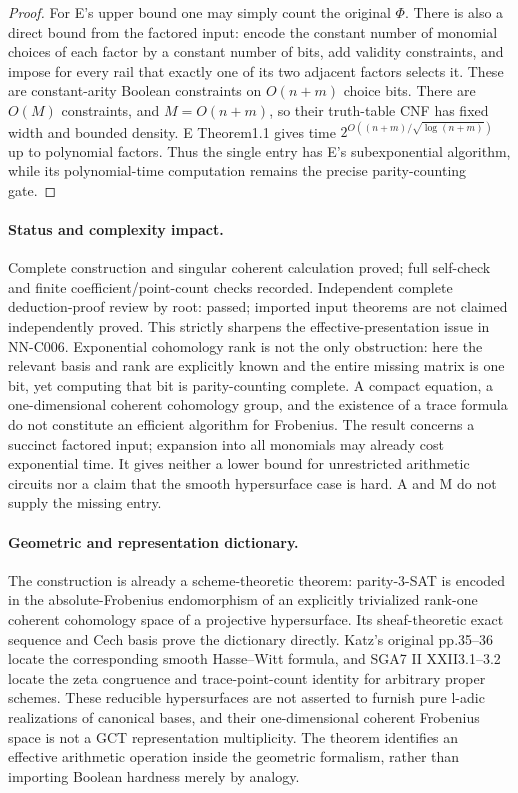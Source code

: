 \begin{proof}
For E's upper bound one may simply count the original $\Phi$. There is also a direct bound from the factored input: encode the constant number of monomial choices of each factor by a constant number of bits, add validity constraints, and impose for every rail that exactly one of its two adjacent factors selects it. These are constant-arity Boolean constraints on $O(n+m)$ choice bits. There are $O(M)$ constraints, and $M=O(n+m)$, so their truth-table CNF has fixed width and bounded density. E Theorem1.1 gives time $2^{O((n+m)/\sqrt{\log(n+m)})}$ up to polynomial factors. Thus the single entry has E's subexponential algorithm, while its polynomial-time computation remains the precise parity-counting gate.
\end{proof}
\paragraph{Status and complexity impact.}
Complete construction and singular coherent calculation proved; full self-check and finite coefficient/point-count checks recorded. Independent complete deduction-proof review by root: passed; imported input theorems are not claimed independently proved. This strictly sharpens the effective-presentation issue in NN-C006. Exponential cohomology rank is not the only obstruction: here the relevant basis and rank are explicitly known and the entire missing matrix is one bit, yet computing that bit is parity-counting complete. A compact equation, a one-dimensional coherent cohomology group, and the existence of a trace formula do not constitute an efficient algorithm for Frobenius. The result concerns a succinct factored input; expansion into all monomials may already cost exponential time. It gives neither a lower bound for unrestricted arithmetic circuits nor a claim that the smooth hypersurface case is hard. A and M do not supply the missing entry.

\paragraph{Geometric and representation dictionary.}
The construction is already a scheme-theoretic theorem: parity-3-SAT is encoded in the absolute-Frobenius endomorphism of an explicitly trivialized rank-one coherent cohomology space of a projective hypersurface. Its sheaf-theoretic exact sequence and Cech basis prove the dictionary directly. Katz's original pp.35--36 locate the corresponding smooth Hasse--Witt formula, and SGA7 II XXII3.1--3.2 locate the zeta congruence and trace-point-count identity for arbitrary proper schemes. These reducible hypersurfaces are not asserted to furnish pure l-adic realizations of canonical bases, and their one-dimensional coherent Frobenius space is not a GCT representation multiplicity. The theorem identifies an effective arithmetic operation inside the geometric formalism, rather than importing Boolean hardness merely by analogy.



